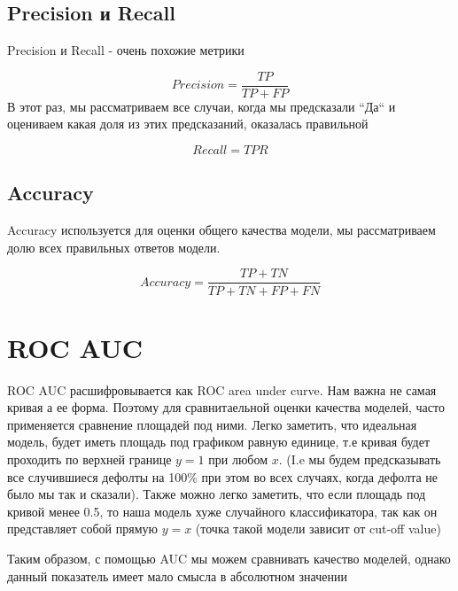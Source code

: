 \documentclass{article}
\begin{document}
        \subsection{Precision и Recall}
            Precision и Recall - очень похожие метрики

            \begin{equation}
                Precision = \dfrac{TP}{TP + FP}
            \end{equation}
            В этот раз, мы рассматриваем все случаи, когда мы предсказали ``Да`` и оцениваем какая доля из этих предсказаний, оказалась правильной

            \begin{equation}
                Recall = TPR
            \end{equation}
    
        \subsection{Accuracy}
            Accuracy используется для оценки общего качества модели,
            мы рассматриваем долю всех правильных ответов модели.


            \begin{equation}
                Accuracy = \dfrac{TP + TN}{TP + TN + FP + FN}
            \end{equation}

    \section{ROC AUC}
        ROC AUC расшифровывается как ROC area under curve. Нам важна не самая кривая а ее форма. Поэтому для сравнитаельной
        оценки качества моделей, часто применяется сравнение площадей под ними. Легко заметить, что
        идеальная модель, будет иметь площадь под графиком равную единице, т.е кривая будет проходить по верхней границе
        $y = 1$ при любом $x$. (I.e мы будем предсказывать все случившиеся дефолты на 100\% при этом во всех случаях, когда дефолта
        не было мы так и сказали). Также можно легко заметить, что если площадь под кривой менее 0.5, то наша модель хуже случайного
        классификатора, так как он представляет собой прямую $y = x$ (точка такой модели зависит от cut-off value)

        \quad

        Таким образом, с помощью AUC мы можем сравнивать качество моделей, однако данный показатель имеет мало смысла в абсолютном значении
\end{document}
